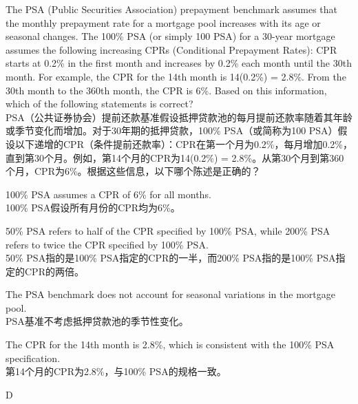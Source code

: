 \documentclass{article}
\newcounter{question} %
\begin{document}
\begin{question}
    The PSA (Public Securities Association) prepayment benchmark assumes that the monthly prepayment rate for a mortgage pool increases with its age or seasonal changes. The 100\% PSA (or simply 100 PSA) for a 30-year mortgage assumes the following increasing CPRs (Conditional Prepayment Rates): CPR starts at 0.2\% in the first month and increases by 0.2\% each month until the 30th month. For example, the CPR for the 14th month is 14(0.2\%) = 2.8\%. From the 30th month to the 360th month, the CPR is 6\%. Based on this information, which of the following statements is correct?\\
    PSA（公共证券协会）提前还款基准假设抵押贷款池的每月提前还款率随着其年龄或季节变化而增加。对于30年期的抵押贷款，100\% PSA（或简称为100 PSA）假设以下递增的CPR（条件提前还款率）：CPR在第一个月为0.2\%，每月增加0.2\%，直到第30个月。例如，第14个月的CPR为14(0.2\%) = 2.8\%。从第30个月到第360个月，CPR为6\%。根据这些信息，以下哪个陈述是正确的？
\end{question}

\begin{choices}
    \item 100\% PSA assumes a CPR of 6\% for all months.\\
    100\% PSA假设所有月份的CPR均为6\%。
    \item 50\% PSA refers to half of the CPR specified by 100\% PSA, while 200\% PSA refers to twice the CPR specified by 100\% PSA.\\
    50\% PSA指的是100\% PSA指定的CPR的一半，而200\% PSA指的是100\% PSA指定的CPR的两倍。
    \item The PSA benchmark does not account for seasonal variations in the mortgage pool.\\
    PSA基准不考虑抵押贷款池的季节性变化。
    \item The CPR for the 14th month is 2.8\%, which is consistent with the 100\% PSA specification.\\
    第14个月的CPR为2.8\%，与100\% PSA的规格一致。
\end{choices}

\begin{correctanswer}
    D
\end{correctanswer}
\end{document}
